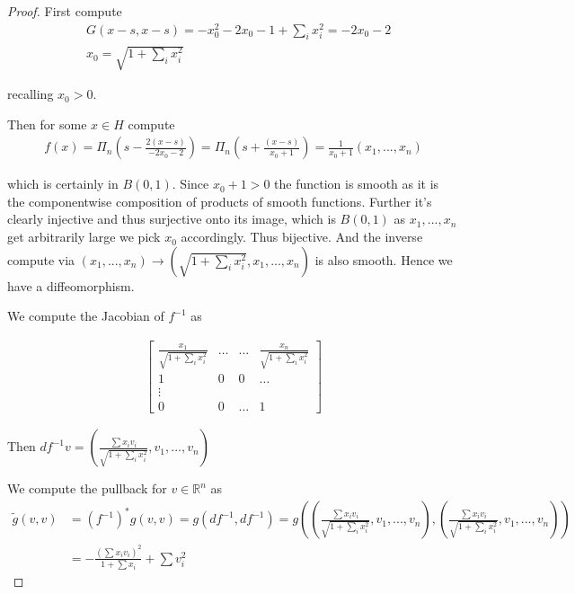 \documentclass[11pt]{article}
\newcommand{\R}{\mathbb{R}}
\begin{document}
\begin{proof}
	First compute
	\begin{align*}
		&G(x-s,x-s) = -x_0^2-2x_0-1 +\sum_ix_i^2 = -2x_0-2\\
		&x_0 = \sqrt{1+\sum_i x_i^2}
	\end{align*}

	recalling $x_0 > 0$. 

	Then for some $x \in H$ compute
	\begin{align*}
		f(x) = \Pi_n(s - \frac{2(x-s)}{-2x_0-2}) = \Pi_n(s + \frac{(x-s)}{x_0+1}) = \frac{1}{x_0+1}(x_1,...,x_n)
	\end{align*}

	which is certainly in $B(0,1)$. Since $x_0 +1 > 0$ the function is smooth as it is the componentwise composition of products of smooth functions. Further it's clearly injective and thus surjective onto its image, which is $B(0,1)$ as $x_1,...,x_n$ get arbitrarily large we pick $x_0$ accordingly. Thus bijective. And the inverse compute via $(x_1,...,x_n) \to (\sqrt{1+\sum_i x_i^2},x_1,...,x_n)$ is also smooth. Hence we have a diffeomorphism.

	We compute the Jacobian of $f^{-1}$ as 

	\begin{align*}
		\begin{bmatrix}
			\frac{x_1}{\sqrt{1+\sum_i x_i^2}} & \hdots & \hdots & \frac{x_n}{\sqrt{1+\sum_i x_i^2}} \\
			1 & 0 & 0 & \hdots \\
			\vdots \\
			0 & 0 & \hdots & 1
		\end{bmatrix}
	\end{align*}

	Then $df^{-1}v = (\frac{\sum x_i v_i}{\sqrt{1+\sum_i x_i^2}},v_1,...,v_n)$

	We compute the pullback for $v \in \R^n$ as 
	\begin{align*}
		\tilde{g}(v,v) &= (f^{-1})^*g(v,v) = g(df^{-1},df^{-1}) = g((\frac{\sum x_i v_i}{\sqrt{1+\sum_i x_i^2}},v_1,...,v_n),(\frac{\sum x_i v_i}{\sqrt{1+\sum_i x_i^2}},v_1,...,v_n)) \\
		&= -\frac{(\sum x_i v_i)^2}{1+ \sum x_i} + \sum v_i^2
	\end{align*}

\end{proof}
\end{document}
